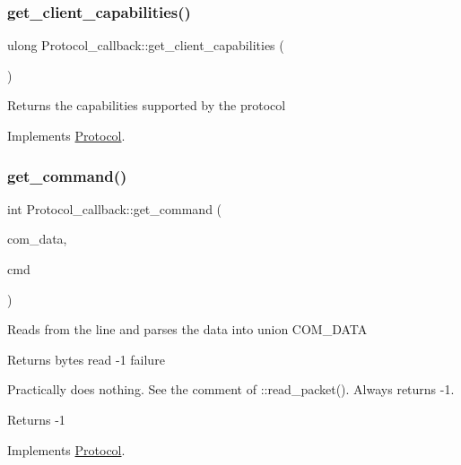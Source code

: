 \subsubsection{\texorpdfstring{get\+\_\+client\+\_\+capabilities()}{get\_client\_capabilities()}}
{\footnotesize\ttfamily ulong Protocol\+\_\+callback\+::get\+\_\+client\+\_\+capabilities (\begin{DoxyParamCaption}{ }\end{DoxyParamCaption})\hspace{0.3cm}{\ttfamily [virtual]}}

Returns the capabilities supported by the protocol 

Implements \mbox{\hyperlink{classProtocol_afc5e8ccb3c29f4b78f7f68cf00b6a713}{Protocol}}.

\mbox{\label{classProtocol__callback_a87b4bf121b5c2851ae2948ca0ea02e37}} 
\subsubsection{\texorpdfstring{get\+\_\+command()}{get\_command()}}
{\footnotesize\ttfamily int Protocol\+\_\+callback\+::get\+\_\+command (\begin{DoxyParamCaption}\item[{C\+O\+M\+\_\+\+D\+A\+TA $\ast$}]{com\+\_\+data,  }\item[{enum\+\_\+server\+\_\+command $\ast$}]{cmd }\end{DoxyParamCaption})\hspace{0.3cm}{\ttfamily [virtual]}}

Reads from the line and parses the data into union C\+O\+M\+\_\+\+D\+A\+TA

\begin{DoxyReturn}{Returns}
bytes read -\/1 failure
\end{DoxyReturn}
Practically does nothing. See the comment of \+::read\+\_\+packet(). Always returns -\/1.

\begin{DoxyReturn}{Returns}
-\/1 
\end{DoxyReturn}


Implements \mbox{\hyperlink{classProtocol_a636debc9b25f4e60864902cdd1b3e87a}{Protocol}}.

\mbox{\label{classProtocol__callback_ae835b42ece0c406a7c3e64195b16ed55}} 
